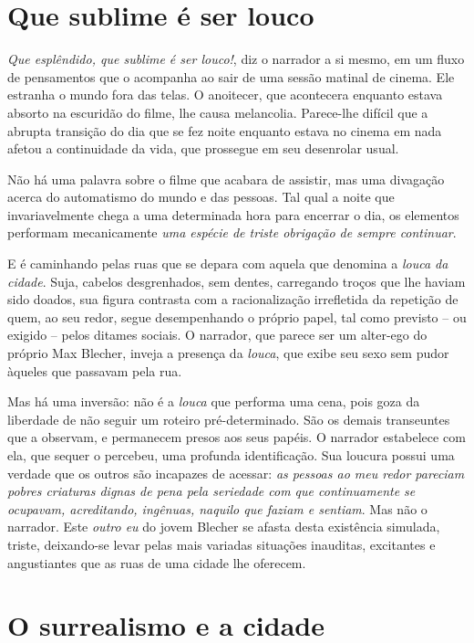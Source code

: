 \section{Que sublime é ser louco}

\textit{Que esplêndido, que sublime é ser louco!}, diz o narrador a si mesmo, em um fluxo de pensamentos que o acompanha ao sair de uma sessão matinal de cinema. Ele estranha o mundo fora das telas. O anoitecer, que acontecera enquanto estava absorto na escuridão do filme, lhe causa melancolia. Parece-lhe difícil que a abrupta transição do dia que se fez noite enquanto estava no cinema em nada afetou a continuidade da vida, que prossegue em seu desenrolar usual.

Não há uma palavra sobre o filme que acabara de assistir, mas uma divagação acerca do automatismo do mundo e das pessoas. Tal qual a noite que invariavelmente chega a uma determinada hora para encerrar o dia, os elementos performam mecanicamente \textit{uma espécie de triste obrigação de sempre continuar}.

E é caminhando pelas ruas que se depara com aquela que denomina a \textit{louca da cidade}. Suja, cabelos desgrenhados, sem dentes, carregando troços que lhe haviam sido doados, sua figura contrasta com a racionalização irrefletida da repetição de quem, ao seu redor, segue desempenhando o próprio papel, tal como previsto -- ou exigido -- pelos ditames sociais. O narrador, que parece ser um alter-ego do próprio Max Blecher, inveja a presença da \textit{louca}, que exibe seu sexo sem pudor àqueles que passavam pela rua.

Mas há uma inversão: não é a \textit{louca} que performa uma cena, pois goza da liberdade de não seguir um roteiro pré-determinado. São os demais transeuntes que a observam, e permanecem presos aos seus papéis. O narrador estabelece com ela, que sequer o percebeu, uma profunda identificação. Sua loucura possui uma verdade que os outros são incapazes de acessar: \textit{as pessoas ao meu redor pareciam pobres criaturas dignas de pena pela seriedade com que continuamente se ocupavam, acreditando, ingênuas, naquilo que faziam e sentiam}. Mas não o narrador. Este \textit{outro eu} do jovem Blecher se afasta desta existência simulada, triste, deixando-se levar pelas mais variadas situações inauditas, excitantes e angustiantes que as ruas de uma cidade lhe oferecem. 

\section{O surrealismo e a cidade}

